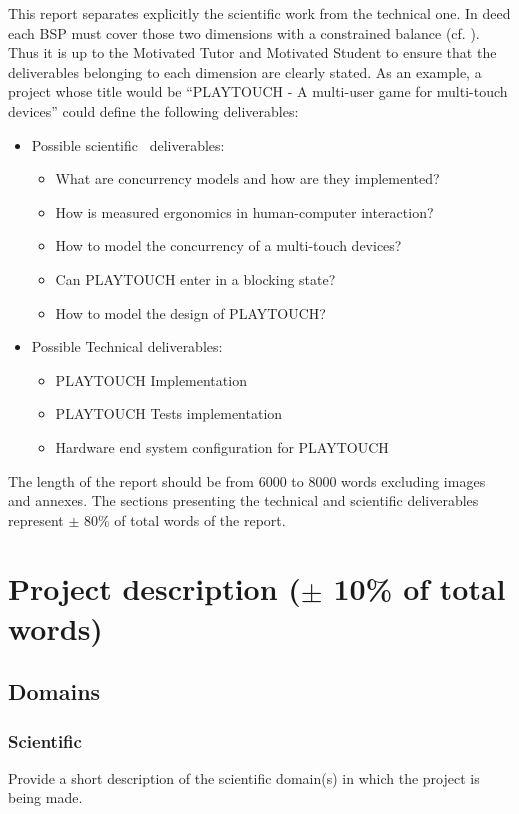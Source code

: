 \documentclass[conference,compsoc]{IEEEtran}
\begin{document}
This report separates explicitly the scientific work from the technical one. In deed each BSP must cover those two dimensions with a constrained balance  (cf. \cite{bics-bsp-reference-document}). Thus it is up to the Motivated Tutor and Motivated Student to ensure that the deliverables belonging to each dimension are clearly stated. As an example, a project whose title would be ``PLAYTOUCH - A multi-user game for multi-touch devices'' could define the following deliverables:
\begin{itemize}
  \item Possible scientific~\cite{armstrong2017guidelinesforscience} deliverables:
		\begin{itemize}
			\item What are concurrency models and how are they implemented?
			\item How is measured ergonomics in human-computer interaction?
			\item How to model the concurrency of a multi-touch devices?
			\item Can PLAYTOUCH enter in a blocking state?
			\item How to model the design of PLAYTOUCH?
		\end{itemize}
  \item Possible Technical deliverables:
		\begin{itemize}
			\item PLAYTOUCH Implementation
			\item PLAYTOUCH Tests implementation
			\item Hardware end system configuration for PLAYTOUCH
		\end{itemize}

\end{itemize}
The length of the report should be from 6000 to 8000 words excluding images and annexes. The sections presenting the technical and scientific deliverables represent $\pm$ 80\% of total words of the report.

\section{Project description ($\pm$ 10\% of total words) }
\subsection{Domains}
\subsubsection{Scientific }
Provide a short description of the scientific domain(s) in which the project is being made.
\end{document}
